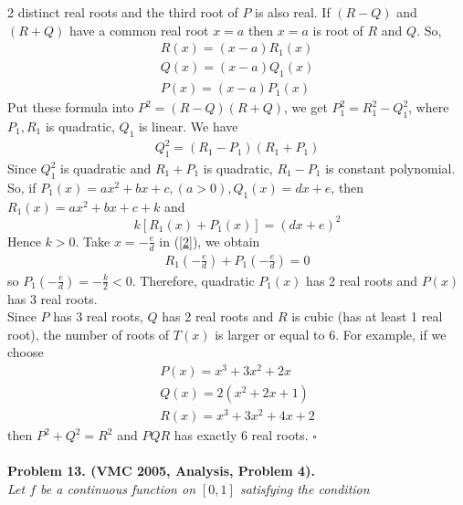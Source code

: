 \documentclass{article}
\numberwithin{equation}{section}
\begin{document}
2 distinct real roots and the third root of $P$ is also real. If $(R-Q)$ and $(R+Q)$ have a common real root $x=a$ then $x=a$ is root of $R$ and $Q$. So, 
\begin{align}
R\left( x \right) = \left( {x - a} \right){R_1}\left( x \right)\\
Q\left( x \right) = \left( {x - a} \right){Q_1}\left( x \right)\\
P\left( x \right) = \left( {x - a} \right){P_1}\left( x \right)
\end{align}
Put these formula into ${P^2} = \left( {R - Q} \right)\left( {R + Q} \right)$, we get $P_1^2 = R_1^2 - Q_1^2$, where $P_1,R_1$ is quadratic, $Q_1$ is linear. We have 
\begin{align}
Q_1^2 = \left( {{R_1} - {P_1}} \right)\left( {{R_1} + {P_1}} \right)
\end{align}
Since $Q_1^2$ is quadratic and $R_1+P_1$ is quadratic, $R_1-P_1$ is constant polynomial. So, if ${P_1}\left( x \right) = a{x^2} + bx + c,\left( {a > 0} \right),{Q_1}\left( x \right) = dx + e$, then ${R_1}\left( x \right) = a{x^2} + bx + c + k$ and 
\begin{equation}
\label{2}
k\left[ {{R_1}\left( x \right) + {P_1}\left( x \right)} \right] = {\left( {dx + e} \right)^2}
\end{equation}
Hence $k>0$. Take $x =  - \frac{e}{d}$ in (\ref{2}), we obtain
\begin{align}
{R_1}\left( { - \frac{e}{d}} \right) + {P_1}\left( { - \frac{e}{d}} \right) = 0
\end{align}
so ${P_1}\left( { - \frac{e}{d}} \right) =  - \frac{k}{2} < 0$. Therefore, quadratic $P_1(x)$ has 2 real roots and $P(x)$ has 3 real roots.\\
Since $P$ has 3 real roots, $Q$ has 2 real roots and $R$ is cubic (has at least 1 real root), the number of roots of $T(x)$ is larger or equal to 6. For example, if we choose
\begin{align}
P\left( x \right) = {x^3} + 3{x^2} + 2x\\
Q\left( x \right) = 2\left( {{x^2} + 2x + 1} \right)\\
R\left( x \right) = {x^3} + 3{x^2} + 4x + 2
\end{align}
then $P^2+Q^2=R^2$ and $PQR$ has exactly 6 real roots. \hfill $\square$\\
\\
\textbf{Problem 13. (VMC 2005, Analysis, Problem 4).}\\
\textit{Let $f$ be a continuous function on $[0,1]$ satisfying the condition}
\end{document}
